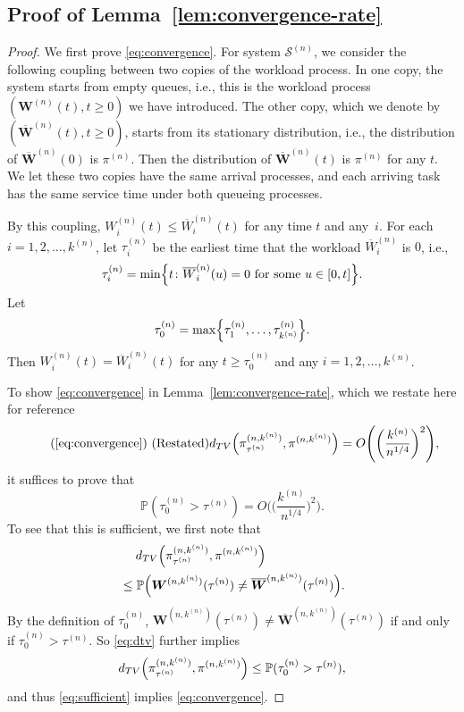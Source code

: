 \documentclass[sigconf]{acmart}
\renewcommand{\Pr}{\mathbb{P}} %
\newcommand{\supn}{^{(n)}}
\begin{document}
\subsection*{\normalsize{Proof of Lemma~\ref{lem:convergence-rate}}}
\begin{proof}
We first prove \eqref{eq:convergence}. For system $\mathcal{S}\supn$, we consider the following coupling between two copies of the workload process. In one copy, the system starts from empty queues, i.e., this is the workload process $(\bm{W}\supn(t),t\ge 0)$ we have introduced. The other copy, which we denote by $(\overline{\bm{W}}\supn(t),t\ge 0)$, starts from its stationary distribution, i.e., the distribution of $\overline{\bm{W}}\supn(0)$ is $\pi^{(n)}$. Then the distribution of $\overline{\bm{W}}\supn(t)$ is $\pi^{(n)}$ for any $t$. We let these two copies have the same arrival processes, and each arriving task has the same service time under both queueing processes.

By this coupling, $W\supn_i(t)\le \overline{W}\supn_i(t)$ for any time $t$ and any~$i$. For each $i=1,2,\dots,k\supn$, let $\tau\supn_i$ be the earliest time that the workload $\overline{W}\supn_i$ is $0$, i.e.,
\begin{equation*}
\tau\supn_i=\min\Bigl\{t\colon \overline{W}\supn_i(u)=0\text{ for some }u\in[0,t]\Bigr\}.
\end{equation*}
Let
\begin{equation*}
\tau\supn_0=\max\Bigl\{\tau\supn_1,\dots,\tau\supn_{k\supn}\Bigr\}.
\end{equation*}
Then $W\supn_i(t)= \overline{W}\supn_i(t)$ for any $t\ge \tau\supn_0$ and any $i=1,2,\dots,k\supn$. 


To show \eqref{eq:convergence} in Lemma~\ref{lem:convergence-rate}, which we restate here for reference
\begin{equation}\tag*{(\ref{eq:convergence}) (Restated)}
d_{TV}\Bigl(\pi_{\tau\supn}^{(n,k\supn)},\pi^{(n,k\supn)}\Bigr)=O\Biggl(\biggl(\frac{k\supn}{n^{1/4}}\biggr)^2\Biggr),
\end{equation}
it suffices to prove that
\begin{equation}\label{eq:sufficient}
\Pr(\tau\supn_0>\tau\supn)=O\Biggl(\biggl(\frac{k\supn}{n^{1/4}}\biggr)^2\Biggr).
\end{equation}
To see that this is sufficient, we first note that
\begin{align}
&\mspace{23mu}d_{TV}\Bigl(\pi_{\tau\supn}^{(n,k\supn)},\pi^{(n,k\supn)}\Bigr)\nonumber\\
&\le \Pr\Bigl(\bm{W}^{(n,k\supn)}(\tau\supn)\neq\overline{\bm{W}}^{(n,k\supn)}(\tau\supn)\Bigr).\label{eq:dtv}
\end{align}
By the definition of $\tau\supn_0$, $\bm{W}^{(n,k\supn)}(\tau\supn)\neq\overline{\bm{W}}^{(n,k\supn)}(\tau\supn)$ if and only if $\tau\supn_0>\tau\supn$. So \eqref{eq:dtv} further implies
\begin{align}
d_{TV}\Bigl(\pi_{\tau\supn}^{(n,k\supn)},\pi^{(n,k\supn)}\Bigr)\le \Pr(\tau\supn_0>\tau\supn),
\end{align}
and thus \eqref{eq:sufficient} implies \eqref{eq:convergence}.


\end{proof}
\end{document}
